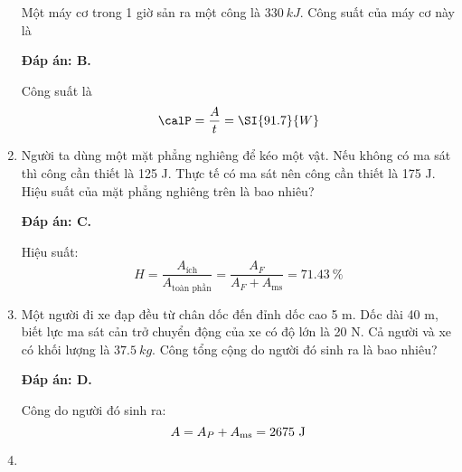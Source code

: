 \begin{enumerate}[label=\bfseries Câu \arabic*:]
	
	{
		Một máy cơ trong 1 giờ sản ra một công là $\SI{330}{kJ}$. Công suất của máy cơ này là
		
	}
	
	\hideall
	{	
		\textbf{Đáp án: B.}
		
		Công suất là
		$$\calP = \dfrac{A}{t} = \SI{91.7}{W}$$
	}
		\item {}
	
	
	{
		Người ta dùng một mặt phẳng nghiêng để kéo một vật. Nếu không có ma sát thì công cần thiết là 125 J. Thực tế có ma sát nên công cần thiết là 175 J. Hiệu suất của mặt phẳng nghiêng trên là bao nhiêu?
		
	}
	
	\hideall
	{	
		\textbf{Đáp án: C.}
		
		Hiệu suất:
		$$H=\dfrac{A_\text{ích}}{A_\text{toàn phần}} = \dfrac{A_F}{A_F + A_\text{ms}} =\SI{71.43}{\%} $$
	}
	\item {}
	
	
	{
		Một người đi xe đạp đều từ chân dốc đến đỉnh dốc cao 5 m. Dốc dài 40 m, biết lực ma sát cản trở chuyển động của xe có độ lớn là 20 N. Cả người và xe có khối lượng là $\SI{37.5}{kg}$. Công tổng cộng do người đó sinh ra là bao nhiêu?
		
	}
	
	\hideall
	{	
		\textbf{Đáp án: D.}
		
		Công do người đó sinh ra:
		$$A=A_P + A_\text{ms} = 2675\ \text J$$	
	}
	\item {}
	

\end{enumerate}
